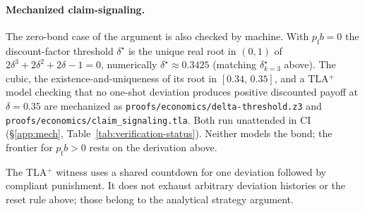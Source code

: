 \documentclass[11pt,a4paper]{article}
\theoremstyle{definition}
\theoremstyle{remark}
\begin{document}
\paragraph{Mechanized claim-signaling.} The zero-bond case of the argument is also checked by machine. With $p_{\mathrm f}b=0$ the discount-factor threshold $\delta^\star$ is the unique real root in $(0,1)$ of $2\delta^3 + 2\delta^2 + 2\delta - 1 = 0$, numerically $\delta^\star \approx 0.3425$ (matching $\delta^\star_{k=3}$ above). The cubic, the existence-and-uniqueness of its root in $[0.34,\,0.35]$, and a TLA$^{+}$ model checking that no one-shot deviation produces positive discounted payoff at $\delta = 0.35$ are mechanized as \texttt{proofs/economics/delta-threshold.z3} and \texttt{proofs/economics/claim\_signaling.tla}. Both run unattended in CI (\S\ref{app:mech}, Table~\ref{tab:verification-status}). Neither models the bond; the frontier for $p_{\mathrm f}b>0$ rests on the derivation above.

The TLA$^{+}$ witness uses a shared countdown for one deviation followed by
compliant punishment. It does not exhaust arbitrary deviation histories or
the reset rule above; those belong to the analytical strategy argument.

\pdexercisepointerone*{\ref{ex:bonded-claim-signaling-pd}}{\pageref{ex:bonded-claim-signaling-pd}}
\end{document}
